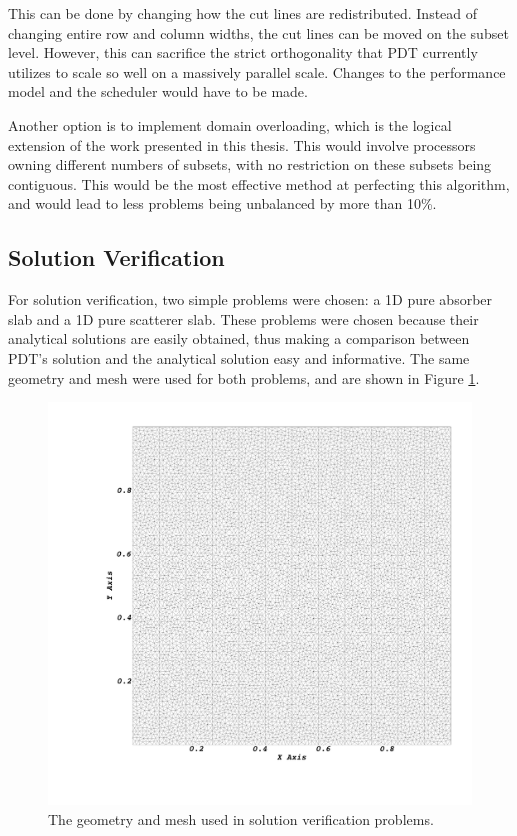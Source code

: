 \documentclass{anstrans}
\begin{document}
This can be done by changing how the cut lines are redistributed. Instead of changing entire row and column widths, the cut lines can be moved on the subset level. However, this can sacrifice the strict orthogonality that PDT currently utilizes to scale so well on a massively parallel scale. Changes to the performance model and the scheduler would have to be made.

Another option is to implement domain overloading, which is the logical extension of the work presented in this thesis. This would involve processors owning different numbers of subsets, with no restriction on these subsets being contiguous. This would be the most effective method at perfecting this algorithm, and would lead to less problems being unbalanced by more than 10\%.

\subsection{Solution Verification}

For solution verification, two simple problems were chosen: a 1D pure absorber slab and a 1D pure scatterer slab. These problems were chosen because their analytical solutions are easily obtained, thus making a comparison between PDT's solution and the analytical solution easy and informative. The same geometry and mesh were used for both problems, and are shown in Figure \ref{verificationgeometry}.

\begin{figure}
\centering
\includegraphics[scale = 0.07,trim = 10cm 10cm 0cm 0cm ]{figures/solutionmesh.png}
\caption{The geometry and mesh used in solution verification problems.}
\label{verificationgeometry}
\end{figure}
\end{document}
